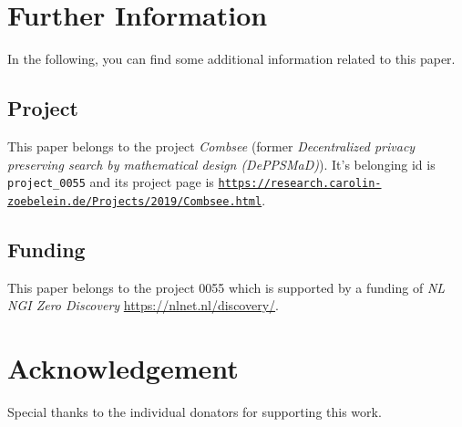 \documentclass[12pt]{../document-templates/papers/one-column-mydashie/mydashie}
\newtheorem*{theorem A}{Theorem A}
\newtheorem*{theorem B}{N\"olker's Theorem}
\theoremstyle{remark}
\theoremstyle{remark}
\begin{document}
\section{Further Information}
\label{s:furtherinformation}
In the following, you can find some additional information related to this paper.
\subsection{Project}
\label{ss:project}
This paper belongs to the project \textit{Combsee} (former \textit{Decentralized privacy preserving search by mathematical design (DePPSMaD)}). It's belonging id is \texttt{project\_0055} and its project page is \href{https://research.carolin-zoebelein.de/Projects/2019/Combsee.html}
	{\nolinkurl{https://research.carolin-zoebelein.de/Projects/2019/Combsee.html}}.
\subsection{Funding}
\label{ss:funding}
This paper belongs to the project 0055 which is supported by a funding of \textit{NL NGI Zero Discovery} \url{https://nlnet.nl/discovery/}.
\section*{Acknowledgement} 
Special thanks to the individual donators for supporting this work.
%
%
%
\end{document}
